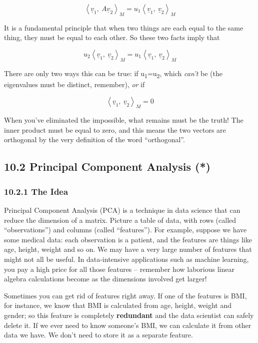 \documentclass[oneside,english]{amsbook}
\numberwithin{section}{chapter}
\theoremstyle{plain}
\theoremstyle{definition}
\begin{document}
\[\left\langle {\underline{v}}_{1},\ A{\underline{v}}_{2} \right\rangle_{M} = u_{1}\left\langle {\underline{v}}_{1},\ {\underline{v}}_{2} \right\rangle_{M}\]

It is a fundamental principle that when two things are each equal to the
same thing, they must be equal to each other. So these two facts imply
that

\[u_{2}\left\langle {\underline{v}}_{1},\ {\underline{v}}_{2} \right\rangle_{M} = u_{1}\left\langle {\underline{v}}_{1},\ {\underline{v}}_{2} \right\rangle_{M}\]

There are only two ways this can be true: if
u\textsubscript{1­}=u­\textsubscript{2}, which \emph{can't} be (the
eigenvalues must be distinct, remember), \emph{or} if

\[\left\langle {\underline{v}}_{1},\ {\underline{v}}_{2} \right\rangle_{M} = 0\]

When you've eliminated the impossible, what remains must be the truth!
The inner product must be equal to zero, and this means the two vectors
are orthogonal by the very definition of the word ``orthogonal''.

\subsection{10.2 Principal Component Analysis
	(*)}\label{principal-component-analysis}

\subsubsection{10.2.1 The Idea}\label{the-idea}

Principal Component Analysis (PCA) is a technique in data science that
can reduce the dimension of a matrix. Picture a table of data, with rows
(called ``observations'') and columns (called ``features''). For
example, suppose we have some medical data: each observation is a
patient, and the features are things like age, height, weight and so on.
We may have a very large number of features that might not all be
useful. In data-intensive applications such as machine learning, you pay
a high price for all those features -- remember how laborious linear
algebra calculations become as the dimensions involved get larger!

Sometimes you can get rid of features right away. If one of the features
is BMI, for instance, we know that BMI is calculated from age, height,
weight and gender; so this feature is completely \textbf{redundant} and
the data scientist can safely delete it. If we ever need to know
someone's BMI, we can calculate it from other data we have. We don't
need to store it as a separate feature.
\end{document}
